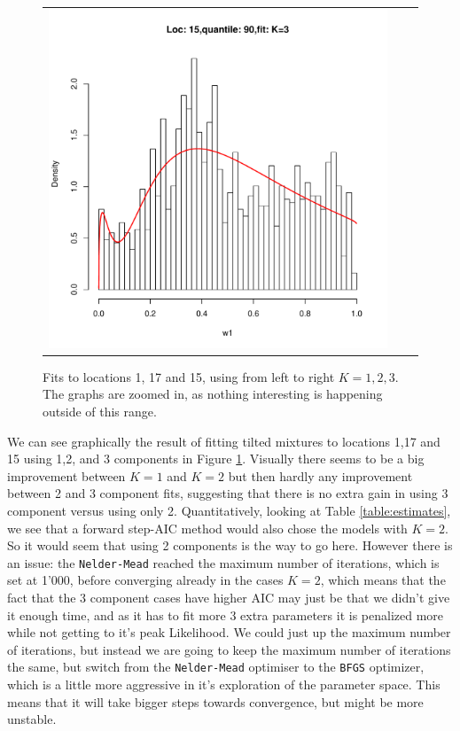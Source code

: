 \documentclass[10pt]{report}
\begin{document}
\begin{figure}[h]
\begin{tabular}{ccc}
\includegraphics[width=\textwidth/3]{../img/loc15/quantile90/fit_K3.pdf}\\
\end{tabular}
\caption{Fits to locations 1, 17 and 15, using from left to right $K=1,2,3$. The graphs are zoomed in, as nothing interesting is happening outside of this range.}
\label{fig:data_fit}
\end{figure}


We can see graphically the result of fitting tilted mixtures to locations 1,17 and 15 using 1,2, and 3 components in Figure \ref{fig:data_fit}. Visually there seems to be a big improvement between $K=1$ and $K=2$ but then hardly any improvement between 2 and 3 component fits, suggesting that there is no extra gain in using 3 component versus using only 2. Quantitatively, looking at Table \ref{table:estimates}, we see that a forward step-AIC method would also chose the models with $K=2$. So it would seem that using 2 components is the way to go here. However there is an issue: the \texttt{Nelder-Mead} reached the maximum number of iterations, which is set at 1'000, before converging already in the cases $K=2$, which means that the fact that the 3 component cases have higher AIC may just be that we didn't give it enough time, and as it has to fit more 3 extra parameters it is penalized more while not getting to it's peak Likelihood.
We could just up the maximum number of iterations, but instead we are going to keep the maximum number of iterations the same, but switch from the \texttt{Nelder-Mead} optimiser to the \texttt{BFGS} optimizer, which is a little more aggressive in it's exploration of the parameter space. This means that it will take bigger steps towards convergence, but might be more unstable.
\end{document}
